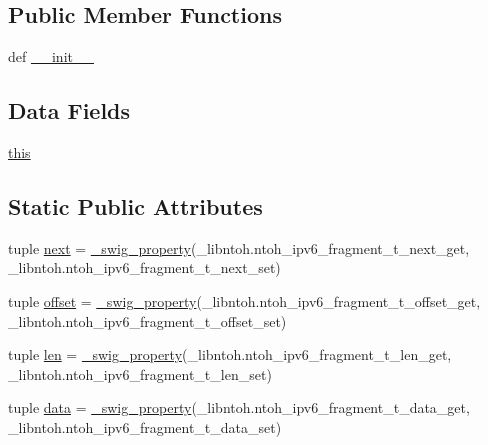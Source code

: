 \subsection*{Public Member Functions}
\begin{DoxyCompactItemize}
\item 
def \hyperlink{classlibntoh_1_1ntoh__ipv6__fragment__t_ac775ee34451fdfa742b318538164070e}{\-\_\-\-\_\-init\-\_\-\-\_\-}
\end{DoxyCompactItemize}
\subsection*{Data Fields}
\begin{DoxyCompactItemize}
\item 
\hyperlink{classlibntoh_1_1ntoh__ipv6__fragment__t_a05c09a5e9d53fa7adf0a7936038c2fa3}{this}
\end{DoxyCompactItemize}
\subsection*{Static Public Attributes}
\begin{DoxyCompactItemize}
\item 
tuple \hyperlink{classlibntoh_1_1ntoh__ipv6__fragment__t_a84e6dac37062f5a539ece8248c8567cc}{next} = \hyperlink{namespacelibntoh_ae6f5626f776538e0cdb00e75ca1c96c9}{\-\_\-swig\-\_\-property}(\-\_\-libntoh.\-ntoh\-\_\-ipv6\-\_\-fragment\-\_\-t\-\_\-next\-\_\-get, \-\_\-libntoh.\-ntoh\-\_\-ipv6\-\_\-fragment\-\_\-t\-\_\-next\-\_\-set)
\item 
tuple \hyperlink{classlibntoh_1_1ntoh__ipv6__fragment__t_a03fbaceb13719d1bc975d26c3b92761a}{offset} = \hyperlink{namespacelibntoh_ae6f5626f776538e0cdb00e75ca1c96c9}{\-\_\-swig\-\_\-property}(\-\_\-libntoh.\-ntoh\-\_\-ipv6\-\_\-fragment\-\_\-t\-\_\-offset\-\_\-get, \-\_\-libntoh.\-ntoh\-\_\-ipv6\-\_\-fragment\-\_\-t\-\_\-offset\-\_\-set)
\item 
tuple \hyperlink{classlibntoh_1_1ntoh__ipv6__fragment__t_af8e41b97a0d8adea11037648944de58f}{len} = \hyperlink{namespacelibntoh_ae6f5626f776538e0cdb00e75ca1c96c9}{\-\_\-swig\-\_\-property}(\-\_\-libntoh.\-ntoh\-\_\-ipv6\-\_\-fragment\-\_\-t\-\_\-len\-\_\-get, \-\_\-libntoh.\-ntoh\-\_\-ipv6\-\_\-fragment\-\_\-t\-\_\-len\-\_\-set)
\item 
tuple \hyperlink{classlibntoh_1_1ntoh__ipv6__fragment__t_aa7a0efb8690a34f61a95b00cc723ca27}{data} = \hyperlink{namespacelibntoh_ae6f5626f776538e0cdb00e75ca1c96c9}{\-\_\-swig\-\_\-property}(\-\_\-libntoh.\-ntoh\-\_\-ipv6\-\_\-fragment\-\_\-t\-\_\-data\-\_\-get, \-\_\-libntoh.\-ntoh\-\_\-ipv6\-\_\-fragment\-\_\-t\-\_\-data\-\_\-set)
\end{DoxyCompactItemize}


